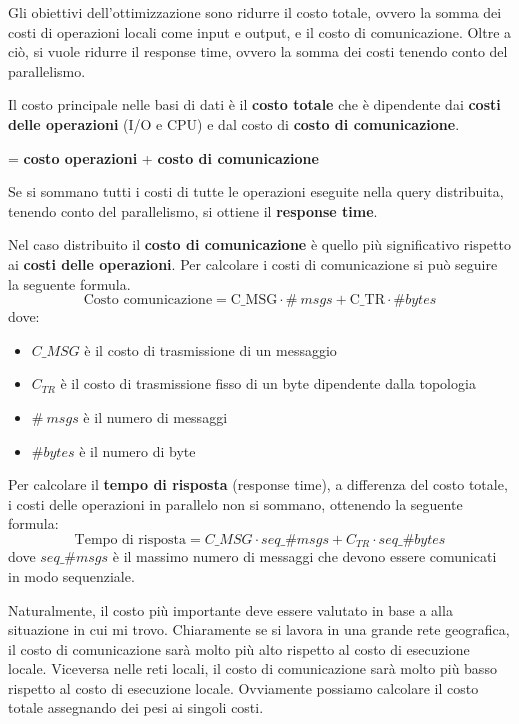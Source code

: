 Gli obiettivi dell'ottimizzazione sono ridurre il costo totale, ovvero la somma
dei costi di operazioni locali come input e output, e il costo di comunicazione.
Oltre a ciò, si vuole ridurre il response time, ovvero la somma dei costi tenendo
conto del parallelismo.

Il costo principale nelle basi di dati è il \textbf{costo totale} che è dipendente
dai \textbf{costi delle operazioni} (I/O e CPU) e dal costo di \textbf{costo di comunicazione}.
\begin{center}
       = \textbf{costo operazioni} + \textbf{costo di comunicazione}
\end{center}
Se si sommano tutti i costi di tutte le operazioni eseguite nella query distribuita,
tenendo conto del parallelismo, si ottiene il \textbf{response time}.

Nel caso distribuito il \textbf{costo di comunicazione} è quello più significativo rispetto
ai \textbf{costi delle operazioni}. Per calcolare i costi di comunicazione si
può seguire la seguente formula.
\begin{equation*}
      \text{Costo comunicazione} = \text{C\_{MSG}} \cdot \#\ msgs  + \text{C\_{TR}} \cdot \#bytes
\end{equation*}
dove:
\begin{itemize}
      \item \textbf{$C\_{MSG}$} è il costo di trasmissione di un messaggio
      \item \textbf{$C_{TR}$} è il costo di trasmissione fisso di un byte
            dipendente dalla topologia
      \item \textbf{$\#\ msgs$} è il numero di messaggi
      \item \textbf{$\#bytes$} è il numero di byte
\end{itemize}
Per calcolare il \textbf{tempo di risposta} (response time), a differenza del
costo totale, i costi delle operazioni in parallelo non si sommano,
ottenendo la seguente formula:
\begin{equation*}
      \text{Tempo di risposta} = C\_{MSG} \cdot seq\_\#msgs + C_{TR} \cdot seq\_\#bytes
\end{equation*}
dove $seq\_\#msgs$ è il massimo numero di messaggi che devono essere comunicati
in modo sequenziale.

Naturalmente, il costo più importante deve essere valutato in base a alla
situazione in cui mi trovo. Chiaramente se si lavora in una grande rete
geografica, il costo di comunicazione sarà molto più alto rispetto al costo di
esecuzione locale. Viceversa nelle reti locali, il costo di comunicazione sarà
molto più basso rispetto al costo di esecuzione locale. Ovviamente possiamo calcolare
il costo totale assegnando dei pesi ai singoli costi.

